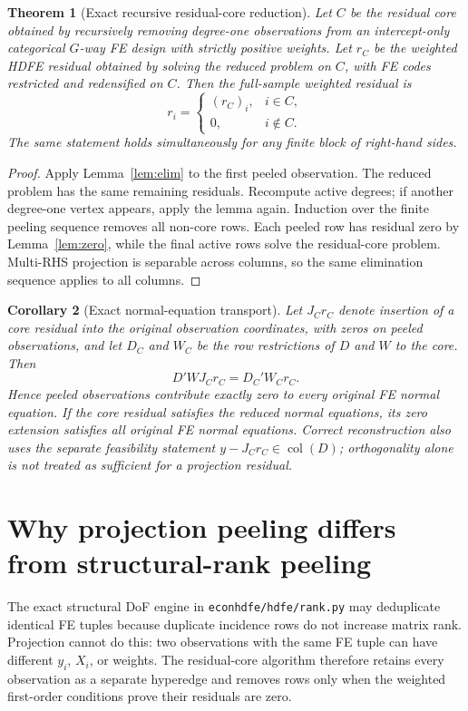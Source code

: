 \documentclass[11pt]{article}
\newtheorem{theorem}{Theorem}[section]
\newtheorem{corollary}[theorem]{Corollary}
\theoremstyle{definition}
\newcommand{\col}{\operatorname{col}}
\newcommand{\1}{\mathbf{1}}
\begin{document}
\begin{theorem}[Exact recursive residual-core reduction]\label{thm:core}
Let $C$ be the residual core obtained by recursively removing degree-one observations from an intercept-only categorical $G$-way FE design with strictly positive weights. Let $r_C$ be the weighted HDFE residual obtained by solving the reduced problem on $C$, with FE codes restricted and redensified on $C$. Then the full-sample weighted residual is
\[
  r_i = \begin{cases}
    (r_C)_i, & i\in C,\\
    0, & i\notin C.
  \end{cases}
\]
The same statement holds simultaneously for any finite block of right-hand sides.
\end{theorem}
\begin{proof}
Apply Lemma~\ref{lem:elim} to the first peeled observation. The reduced problem has the same remaining residuals. Recompute active degrees; if another degree-one vertex appears, apply the lemma again. Induction over the finite peeling sequence removes all non-core rows. Each peeled row has residual zero by Lemma~\ref{lem:zero}, while the final active rows solve the residual-core problem. Multi-RHS projection is separable across columns, so the same elimination sequence applies to all columns.
\end{proof}

\begin{corollary}[Exact normal-equation transport]
Let $J_C r_C$ denote insertion of a core residual into the original observation
coordinates, with zeros on peeled observations, and let $D_C$ and $W_C$ be the
row restrictions of $D$ and $W$ to the core. Then
\[
  D'WJ_C r_C = D_C'W_C r_C.
\]
Hence peeled observations contribute exactly zero to every original FE normal
equation. If the core residual satisfies the reduced normal equations, its zero
extension satisfies all original FE normal equations. Correct reconstruction
also uses the separate feasibility statement
$y-J_Cr_C\in\col(D)$; orthogonality alone is not treated as sufficient for a
projection residual.
\end{corollary}

\section{Why projection peeling differs from structural-rank peeling}

The exact structural DoF engine in \texttt{econhdfe/hdfe/rank.py} may deduplicate identical FE tuples because duplicate incidence rows do not increase matrix rank. Projection cannot do this: two observations with the same FE tuple can have different $y_i$, $X_i$, or weights. The residual-core algorithm therefore retains every observation as a separate hyperedge and removes rows only when the weighted first-order conditions prove their residuals are zero.
\end{document}
